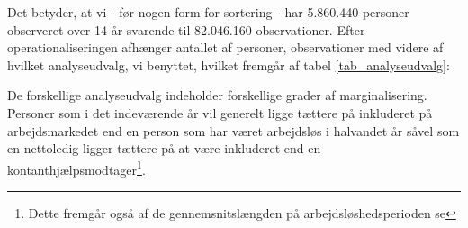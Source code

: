 Det betyder, at vi - før nogen form for sortering - har 5.860.440 personer observeret over 14 år svarende til 82.046.160 observationer. Efter operationaliseringen afhænger antallet af personer, observationer med videre af hvilket analyseudvalg, vi benyttet, hvilket fremgår af tabel \ref{tab_analyseudvalg}:
%
\newpage
\begin{table}[H]
\centering
\caption{Oversigt over operationaliseringer. Kilde: DST}
\label{tab_ledfuld_leddel}
\end{table}
% 
De forskellige analyseudvalg indeholder forskellige grader af marginalisering. Personer som i det indeværende år vil generelt ligge tættere på inkluderet på arbejdsmarkedet end en person som har været arbejdsløs i halvandet år såvel som en nettoledig ligger tættere på at være inkluderet end en kontanthjælpsmodtager\footnote{Dette fremgår også af de gennemsnitslængden på arbejdsløshedsperioden se }. 

